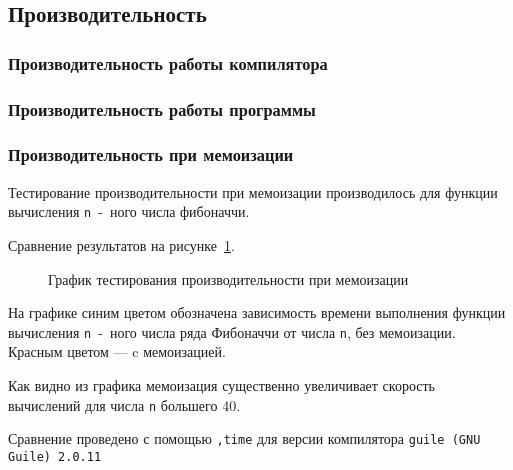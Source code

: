     \subsection{Производительность}
        \subsubsection{Производительность работы компилятора}
        \subsubsection{Производительность работы программы}
        \subsubsection{Производительность при мемоизации}

        Тестирование производительности при мемоизации производилось для функции вычисления \verb,n,~-~ного числа фибоначчи.

        Сравнение результатов на рисунке~\ref{pic:memo}.

        \begin{figure}[ht!]
            \centering
            \caption{График тестирования производительности при мемоизации}
            \label{pic:memo}
        \end{figure}

    На графике синим цветом обозначена зависимость времени выполнения функции вычисления \verb,n,~-~ного числа ряда Фибоначчи от числа \verb,n,, без мемоизации.
    Красным цветом --- c мемоизацией.

    Как видно из графика мемоизация существенно увеличивает скорость вычислений для числа \verb,n, большего 40.

    Сравнение проведено с помощью \verb;,time; для версии компилятора \verb,guile (GNU Guile) 2.0.11,
